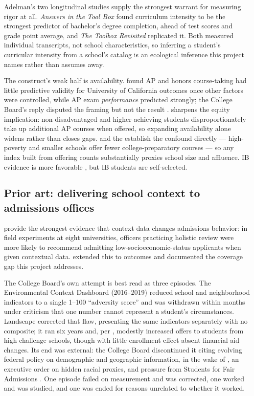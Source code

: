 \documentclass[12pt]{article}
\begin{document}
Adelman's two longitudinal studies supply the strongest warrant for measuring rigor at all. \textit{Answers in the Tool Box} \citep{adelman1999} found curriculum intensity to be the strongest predictor of bachelor's degree completion, ahead of test scores and grade point average, and \textit{The Toolbox Revisited} \citep{adelman2006} replicated it. Both measured individual transcripts, not school characteristics, so inferring a student's curricular intensity from a school's catalog is an ecological inference this project names rather than assumes away.

The construct's weak half is availability. \citet{geiser2004} found AP and honors course-taking had little predictive validity for University of California outcomes once other factors were controlled, while AP exam \emph{performance} predicted strongly; the College Board's reply disputed the framing but not the result \citep{camara2005}. \citet{owen2025} sharpens the equity implication: non-disadvantaged and higher-achieving students disproportionately take up additional AP courses when offered, so expanding availability alone widens rather than closes gaps. \citet{kolluri2018} and the \citet{gao2018} establish the confound directly --- high-poverty and smaller schools offer fewer college-preparatory courses --- so any index built from offering counts substantially proxies school size and affluence. IB evidence is more favorable \citep{coca2012}, but IB students are self-selected.

\subsection{Prior art: delivering school context to admissions offices}
\label{sec:prior-art}

\citet{bastedo2022} provide the strongest evidence that context data changes admissions behavior: in field experiments at eight universities, officers practicing holistic review were more likely to recommend admitting low-socioeconomic-status applicants when given contextual data. \citet{bastedo2023} extended this to outcomes and documented the coverage gap this project addresses.

The College Board's own attempt is best read as three episodes. The Environmental Context Dashboard (2016--2019) reduced school and neighborhood indicators to a single 1--100 ``adversity score'' and was withdrawn within months under criticism that one number cannot represent a student's circumstances. Landscape corrected that flaw, presenting the same indicators separately with no composite; it ran six years and, per \citet{mabel2022}, modestly increased offers to students from high-challenge schools, though with little enrollment effect absent financial-aid changes. Its end was external: the College Board discontinued it citing evolving federal policy on demographic and geographic information, in the wake of \citet{sffa2023}, an executive order on hidden racial proxies, and pressure from Students for Fair Admissions \citep{philogene2025,collegeboard_landscape}. One episode failed on measurement and was corrected, one worked and was studied, and one was ended for reasons unrelated to whether it worked.
\end{document}
